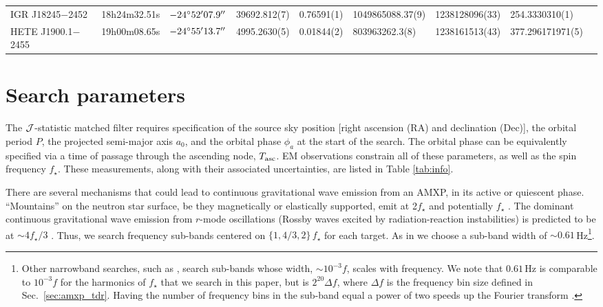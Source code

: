 \begin{landscape}
\begin{table}
{\begin{NiceTabular}{l l l l l l l l l}
IGR J18245$-$2452    & 18h24m32.51s  & $-24^{\circ}52'07.9''$     & 39692.812(7)  & 0.76591(1)    & 1049865088.37(9)  & 1238128096(33)      & 254.3330310(1)   & \cite{Pallanca2013, Papitto18245}  \\
HETE J1900.1$-$2455  & 19h00m08.65s  & $-24^{\circ}55'13.7''$     & 4995.2630(5)  & 0.01844(2)    & 803963262.3(8)    & 1238161513(43)      & 377.296171971(5) & \cite{Fox2005, Kaaret2006, Patruno1900} \\
\bottomrule
\end{NiceTabular}
}
\end{table}
\end{landscape}

\section{Search parameters \label{sec:amxp_params}} 
The $\mathcal{J}$-statistic matched filter requires specification of the source sky position [right ascension (RA) and declination (Dec)], the orbital period $P$, the projected semi-major axis $a_0$, and the orbital phase $\phi_a$ at the start of the search. The orbital phase can be equivalently specified via a time of passage through the ascending node, $T_{\textrm{asc}}$. EM observations constrain all of these parameters, as well as the spin frequency $f_\star$. These measurements, along with their associated uncertainties, are listed in Table \ref{tab:info}.

There are several mechanisms that could lead to continuous gravitational wave emission from an AMXP, in its active or quiescent phase. ``Mountains'' on the neutron star surface, be they magnetically or elastically supported, emit at 2$f_\star$ and potentially $f_\star$ \cite{Jones2010}. The dominant continuous gravitational wave emission from $r$-mode oscillations (Rossby waves excited by radiation-reaction instabilities) is predicted to be at $\sim4f_\star / 3$ \cite{Andersson1998, Friedman1998, Yoshida2001, Alford2012}. Thus, we search frequency sub-bands centered on $\{1, 4/3, 2 \}\,f_\star$ for each target. As in \citet{o2vitsco, Middleton2020} we choose a sub-band width of $\sim0.61\,$Hz\footnote{Other narrowband searches, such as \citet{o1narrow, o2narrow}, search sub-bands whose width, $\sim 10^{-3} f$, scales with frequency. We note that $0.61\,$Hz is comparable to $10^{-3}f$ for the harmonics of $f_\star$ that we search in this paper, but is $2^{20} \Delta f$, where $\Delta f$ is the frequency bin size defined in Sec.~\ref{sec:amxp_tdr}. Having the number of frequency bins in the sub-band equal a power of two speeds up the Fourier transform \cite{o2vitsco}.}.

